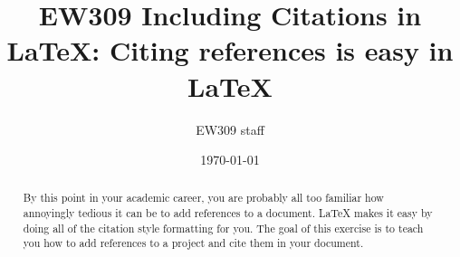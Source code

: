 \documentclass[10pt]{article}
\title{EW309 Including Citations in \LaTeX: Citing references is easy in \LaTeX}
\author{EW309 staff}
\date{\today}
\begin{document}
\maketitle 

\begin{abstract}
  By this point in your academic career, you are probably all too familiar how annoyingly tedious it can be to add references to a document. LaTeX makes it easy by doing all of the citation style formatting for you. The goal of this exercise is to teach you how to add references to a project and cite them in your document.
\end{abstract}
\end{document}
